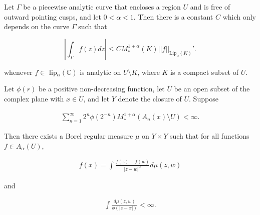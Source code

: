 \documentclass[10pt,a4paper]{amsart}
\begin{document}
\begin{lemma}
\label{Lord}
     Let $\Gamma$ be a piecewise analytic curve that encloses a region $U$ and is free of outward pointing cusps, and let $0<\alpha<1$. Then there is a constant $C$ which only depends on the curve $\Gamma$ such that

\begin{equation*} 
\left| \int_{\Gamma} f(z) dz\right| \leq C M_*^{1+\alpha}(K) ||f||_{\text{Lip}_\alpha(K)}'.
\end{equation*}

\noindent whenever $f \in $ lip$_\alpha(\mathbb C)$
 is analytic on $U \setminus K$, where $K$ is a compact subset of $U$.

\end{lemma}

\begin{theorem}
\label{c then b}
 Let $\phi(r)$ be a positive non-decreasing function, let $U$ be an open subset of the complex plane with $x \in U$, and let $Y$ denote the closure of $U$. Suppose

\begin{align*}
    \sum_{n=1}^{\infty} 2^n \phi(2^{-n}) M^{1+\alpha}_*(A_n(x) \setminus U) < \infty.
\end{align*}


\noindent Then there exists a Borel regular measure $\mu$ on $Y \times Y$ such that for all functions $f \in A_\alpha(U)$,

\begin{align*}
    f(x) = \int \frac{f(z)-f(w)}{|z-w|^{\alpha}} d\mu(z,w)
\end{align*}


\noindent and 

\begin{align*}
    \int \frac{d\mu(z,w)}{\phi(|z-x|)} < \infty.
\end{align*}
    
\end{theorem}
\end{document}
